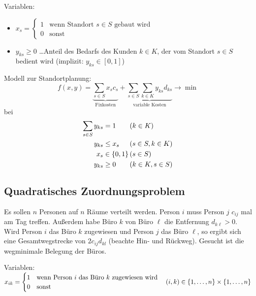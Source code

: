 Variablen:
\begin{itemize}[nolistsep, topsep=-\parskip]
	\item $x_s = \begin{cases} 1 & \text{wenn Standort } s \in S \text{ gebaut wird} \\ 0 & \text{sonst} \end{cases}$ 
	\item $y_{ks} \ge 0$ \dots Anteil des Bedarfs des Kunden $k \in K$, der vom Standort $s \in S$ bedient wird (implizit: $y_{ks} \in [0,1]$)
\end{itemize}

Modell zur Standortplanung:
\begin{equation*}
	f(x,y) = \underbrace{\sum_{s \in S} x_s c_s}_{\text{Fixkosten}}  + \underbrace{\sum_{s \in S} \sum_{k \in K} y_{ks} d_{ks}}_{\text{variable Kosten}} \to \min
\end{equation*}
bei
\begin{equation*}
\begin{alignedat}{2}
	\sum_{s \in S} y_{ks} &= 1 &&(k \in K) \\
	y_{ks} &\le x_s &&(s \in S, k \in K) \\
	x_s &\in \left\{ 0,1 \right\}  &&(s \in S) \\
	y_{ks} &\ge 0\qquad &&(k \in K, s \in S)
\end{alignedat}
\end{equation*}

\subsection{Quadratisches Zuordnungsproblem}

Es sollen $n$ Personen auf $n$ Räume verteilt werden. Person $i$ muss Person $j$ $c_{ij}$ mal am Tag treffen. Außerdem habe Büro $k$ von Büro $\ell$ die Entfernung $d_{k \ell}>0$. Wird Person $i$ das Büro $k$ zugewiesen und Person $j$ das Büro $\ell$, so ergibt sich eine Gesamtwegstrecke von $2 c_{ij} d_{kl}$ (beachte Hin- und Rückweg). Gesucht ist die wegminimale Belegung der Büros.

Variablen: $x_{ik} = \begin{cases}
	1 & \text{wenn Person $i$ das Büro $k$ zugewiesen wird} \\ 0 & \text{sonst}
	\end{cases} \quad (i,k) \in \left\{ 1, \dots , n \right\} \times \left\{ 1, \dots , n \right\}$
	
